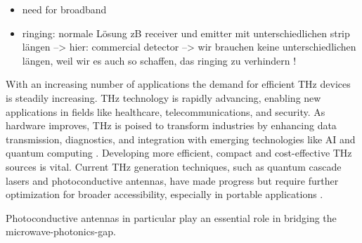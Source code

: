 \begin{itemize}
    \item need for broadband 
    \item ringing: normale Lösung zB receiver und emitter mit unterschiedlichen strip längen --> hier: commercial detector --> wir brauchen keine unterschiedlichen längen, weil wir es auch so schaffen, das ringing zu verhindern !
\end{itemize}

With an increasing number of applications the demand for efficient THz devices is steadily increasing. THz technology is rapidly advancing, enabling new applications in fields like healthcare, telecommunications, and security. As hardware improves, THz is poised to transform industries by enhancing data transmission, diagnostics, and integration with emerging technologies like AI and quantum computing \cite{shekariApplicationsTerahertzTechnology2025}. Developing more efficient, compact and cost-effective THz sources is vital. Current THz generation techniques, such as quantum cascade lasers and photoconductive antennas, have made progress but require further optimization for broader accessibility, especially in portable applications \cite{THzSecurityApplications}. 

Photoconductive antennas in particular play an essential role in bridging the microwave-photonics-gap. 